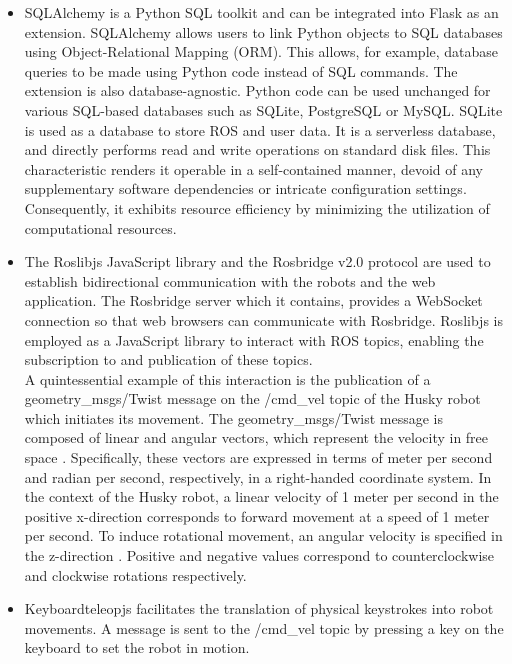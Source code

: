 \documentclass[conference]{IEEEtran}
\begin{document}
\begin{itemize}
\item SQLAlchemy is a Python SQL toolkit and can be integrated into Flask as an extension. SQLAlchemy allows users to link Python objects to SQL databases using Object-Relational Mapping (ORM). This allows, for example, database queries to be made using Python code instead of SQL commands. The extension is also database-agnostic. 
Python code can be used unchanged for various SQL-based databases such as SQLite, PostgreSQL or MySQL. \cite{sqlalchemy} 
SQLite is used as a database to store ROS and user data. It is a serverless database, and directly performs read and write operations on standard disk files. This characteristic renders it operable in a self-contained manner, devoid of any supplementary software dependencies or intricate configuration settings. Consequently, it exhibits resource efficiency by minimizing the utilization of computational resources. \cite{sqlite}
\item The Roslibjs JavaScript library and the Rosbridge v2.0 protocol are used to establish bidirectional communication with the robots and the web application. The Rosbridge server which it contains, provides a WebSocket connection so that web browsers can communicate with Rosbridge.
Roslibjs is employed as a JavaScript library to interact with ROS topics, enabling the subscription to and publication of these topics. \cite{rosbridgeOkState, rosbridgeSuite}\\ A quintessential example of this interaction is the publication of a geometry\_msgs/Twist message on the /cmd\_vel topic of the Husky robot which initiates its movement.
The geometry\_msgs/Twist message is composed of linear and angular vectors, which represent the velocity in free space \cite{twistmsg}. Specifically, these vectors are expressed in terms of meter per second and radian per second, respectively, in a right-handed coordinate system.
In the context of the Husky robot, a linear velocity of 1 meter per second in the positive x-direction corresponds to forward movement at a speed of 1 meter per second. To induce rotational movement, an angular velocity is specified in the z-direction \cite{huskydriving}. Positive and negative values correspond to counterclockwise and clockwise rotations respectively.
\item Keyboardteleopjs facilitates the translation of physical keystrokes into robot movements. A message is sent to the /cmd\_vel topic by pressing a key on the keyboard to set the robot in motion. \cite{keyboardteleopjs}

\end{itemize}
\end{document}
